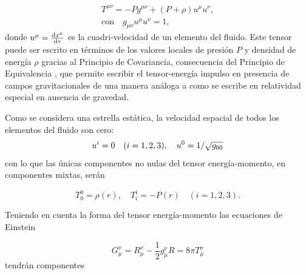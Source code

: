 \begin{equation}
    \begin{array} { c } { T ^ { \mu \nu } = - P g ^ { \mu \nu } + ( P + \rho ) u ^ { \mu } u ^ { \nu } }, \\ \text{con} \quad { g _ { \mu \nu } u ^ { \mu } u ^ { \nu } = 1 }, \end{array}
\end{equation}
donde $u^{\mu}=\dv{x^{\mu}}{\tau}$ es la cuadri-velocidad de un elemento del fluido. Este tensor puede ser escrito en términos de los valores locales de presión $P$ y densidad de energía $\rho$ gracias al Principio de Covariancia, consecuencia del Principio de Equivalencia \cite{Weinberg1972GravitationCosmology}, que permite escribir el tensor-energía impulso en presencia de campos gravitacionales de una manera análoga a como se escribe en relatividad especial en ausencia de gravedad.

Como se considera una estrella estática, la velocidad espacial de todos los elementos del fluido son cero:
\begin{equation}
    u^{i}=0 \quad (i=1,2,3)\qc u ^ { 0 } = 1 / \sqrt { g _ { 00 } }
\end{equation}
con lo que las únicas componentes no nulas del tensor energía-momento, en componentes mixtas, serán

\begin{equation}
T _ { 0 } ^ { 0 } = \rho(r) , \quad T _ { i } ^ { i } = - P(r) \quad ( i=1,2,3 ).  
\end{equation}

Teniendo en cuenta la forma del tensor energía-momento las ecuaciones de Einstein

\begin{equation}
    G _ { \mu } ^ { \nu } = R _ { \mu } ^ { \nu } - \frac { 1 } { 2 } g _ { \mu } ^ { \nu } R = 8 \pi T _ { \mu } ^ { \nu }
\end{equation}
tendrán componentes     


